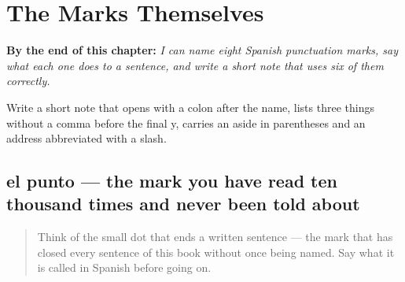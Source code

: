 
\chapter{The Marks Themselves}
\label{ch:signos}

\begin{chapteropening}
\textbf{By the end of this chapter:} \emph{I can name eight Spanish punctuation marks, say what each one does to a sentence, and write a short note that uses six of them correctly.}

Write a short note that opens with a colon after the name, lists three things without a comma before the final y, carries an aside in parentheses and an address abbreviated with a slash.
\end{chapteropening}

\section[el punto]{el punto — the mark you have read ten thousand times and never been told about}

\label{lesson:ES-C424-punto}



\begin{quote}
Think of the small dot that ends a written sentence — the mark that has closed every sentence of this book without once being named. Say what it is called in Spanish before going on.
\end{quote}

